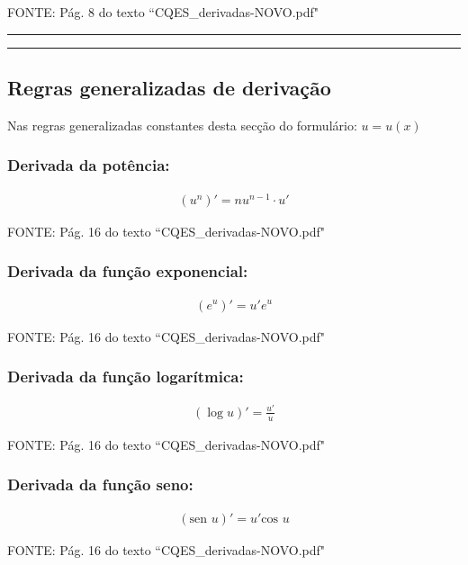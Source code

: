 \documentclass[portuguese,a4paper,12pt,onecolumn,fleqn]{article}
\newcommand{\myline}{\par
  \kern3pt %
  \hrule height 1.5pt
  \kern2pt %
  \hrule height 0.8pt
  \kern3pt %
}
\begin{document}
FONTE: Pág. 8 do texto ``CQES\_derivadas-NOVO.pdf"


\myline	%


\subsection*{Regras generalizadas de derivação}

Nas regras generalizadas constantes desta secção do formulário: $u = u(x)$

\subsubsection*{Derivada da potência:}

\begin{gather*}
(u^n)' = n u^{n-1} \cdot u'
\end{gather*}

FONTE: Pág. 16 do texto ``CQES\_derivadas-NOVO.pdf"


\subsubsection*{Derivada da função exponencial:}

\begin{gather*}
(e^u)' = u' e^u
\end{gather*}

FONTE: Pág. 16 do texto ``CQES\_derivadas-NOVO.pdf"


\subsubsection*{Derivada da função logarítmica:}

\begin{gather*}
(\log u)' = \frac{u'}{u}
\end{gather*}

FONTE: Pág. 16 do texto ``CQES\_derivadas-NOVO.pdf"


\subsubsection*{Derivada da função seno:}

\begin{gather*}
(\textrm{sen } u)' = u' \textrm{cos } u
\end{gather*}

FONTE: Pág. 16 do texto ``CQES\_derivadas-NOVO.pdf"
\end{document}
